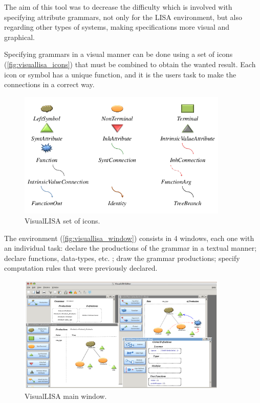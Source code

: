 The aim of this tool was to decrease the difficulty which is involved with specifying attribute grammars, not only for the LISA environment, but also regarding other types of systems, making specifications more visual and graphical.
    
Specifying grammars in a visual manner can be done using a set of icons (\autoref{fig:visuallisa_icons}) that must be combined to obtain the wanted result. Each icon or symbol has a unique function, and it is the users task to make the connections in a correct way.
    
\begin{figure}[h]
    \centering
    \includegraphics[width=10cm]{images/visuallisa_icons.png}
    \caption{VisualLISA set of icons.}
    \label{fig:visuallisa_icons}
\end{figure}

\newpage
The environment (\autoref{fig:visuallisa_window}) consists in 4 windows, each one with an individual task: declare the productions of the grammar in a textual manner; declare functions, data-types, etc. ; draw the grammar productions; specify computation rules that were previously declared.
    
\begin{figure}[h]
    \centering
    \includegraphics[width=10cm]{images/visuallisa_window.png}
    \caption{VisualLISA main window.}
    \label{fig:visuallisa_window}
\end{figure}
    
